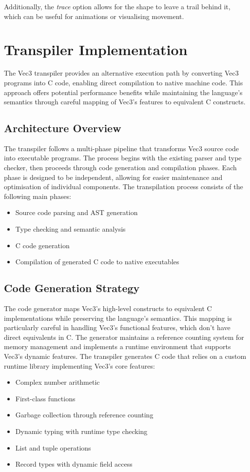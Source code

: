 Additionally, the \textit{trace} option allows for the shape to leave a trail behind it, which can be useful for
animations or visualising movement.

\section{Transpiler Implementation} \label{sec:transpiler-implementation}
The Vec3 transpiler provides an alternative execution path by converting Vec3 programs into C code, enabling direct compilation to native machine code. This approach offers potential performance benefits while maintaining the language's semantics through careful mapping of Vec3's features to equivalent C constructs.
\subsection{Architecture Overview}
The transpiler follows a multi-phase pipeline that transforms Vec3 source code into executable programs. The process begins with the existing parser and type checker, then proceeds through code generation and compilation phases. Each phase is designed to be independent, allowing for easier maintenance and optimisation of individual components.
The transpilation process consists of the following main phases:
\begin{itemize}
\item Source code parsing and AST generation
\item Type checking and semantic analysis
\item C code generation
\item Compilation of generated C code to native executables
\end{itemize}
\subsection{Code Generation Strategy}
The code generator maps Vec3's high-level constructs to equivalent C implementations while preserving the language's semantics. 
This mapping is particularly careful in handling Vec3's functional features, which don't have direct equivalents in C. The generator maintains a reference counting system for memory management and implements a runtime environment that supports Vec3's dynamic features.
The transpiler generates C code that relies on a custom runtime library implementing Vec3's core features:
\begin{itemize}
\item Complex number arithmetic
\item First-class functions
\item Garbage collection through reference counting
\item Dynamic typing with runtime type checking
\item List and tuple operations
\item Record types with dynamic field access
\end{itemize}
